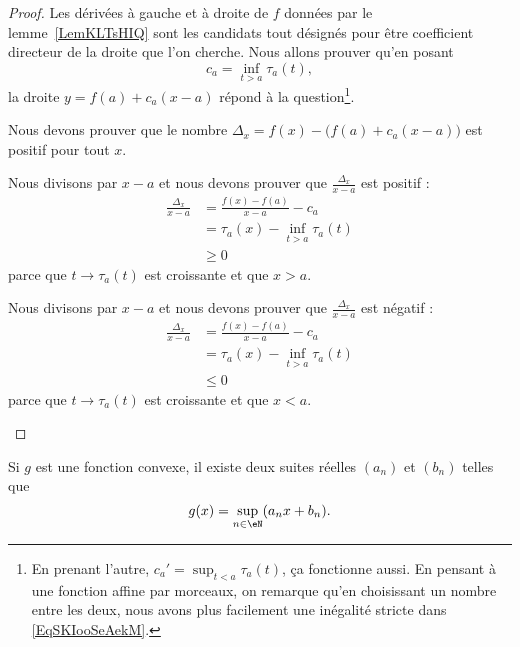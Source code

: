 \begin{proof}
	Les dérivées à gauche et à droite de \( f\) données par le lemme~\ref{LemKLTsHIQ} sont les candidats tout désignés pour être coefficient directeur de la droite que l'on cherche. Nous allons prouver qu'en posant
	\begin{equation}
		c_a=\inf_{t>a}\tau_a(t),
	\end{equation}
	la droite \( y=f(a)+c_a(x-a)\) répond à la question\footnote{En prenant l'autre, \( c_a'=\sup_{t<a}\tau_a(t)\), ça fonctionne aussi. En pensant à une fonction affine par morceaux, on remarque qu'en choisissant un nombre entre les deux, nous avons plus facilement une inégalité stricte dans \eqref{EqSKIooSeAekM}.}.

	Nous devons prouver que le nombre \( \Delta_x=f(x)-\big( f(a)+c_a(x-a) \big)\) est positif pour tout \( x\).
	\begin{subproof}

		\spitem[Si \( x>a\)]

		Nous divisons par \( x-a\) et nous devons prouver que \( \frac{ \Delta_x }{ x-a }\) est positif :
		\begin{subequations}
			\begin{align}
				\frac{ \Delta_x }{ x-a } & =\frac{ f(x)-f(a) }{ x-a }-c_a \\
				                         & =\tau_a(x)-\inf_{t>a}\tau_a(t) \\
				                         & \geq 0
			\end{align}
		\end{subequations}
		parce que \( t\to\tau_a(t)\) est croissante et que \( x>a\).

		\spitem[Si \( x<a\)]

		Nous divisons par \( x-a\) et nous devons prouver que \( \frac{ \Delta_x }{ x-a }\) est négatif :
		\begin{subequations}
			\begin{align}
				\frac{ \Delta_x }{ x-a } & =\frac{ f(x)-f(a) }{ x-a }-c_a \\
				                         & =\tau_a(x)-\inf_{t>a}\tau_a(t) \\
				                         & \leq 0
			\end{align}
		\end{subequations}
		parce que \( t\to\tau_a(t)\) est croissante et que \( x<a\).
	\end{subproof}
\end{proof}

\begin{proposition}  \label{PropPEJCgCH}
	Si \( g\) est une fonction convexe, il existe deux suites réelles \( (a_n)\) et \( (b_n)\) telles que
	\begin{equation}
		g(x)=\sup_{n\in \eN}(a_nx+b_n).
	\end{equation}
\end{proposition}

